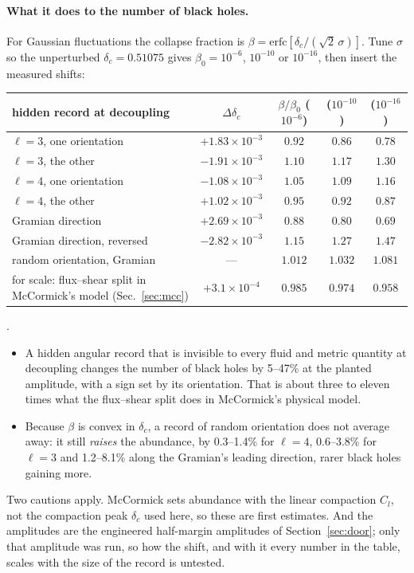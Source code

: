 \paragraph{What it does to the number of black holes.} For Gaussian fluctuations the collapse fraction is $\beta=\mathrm{erfc}[\delta_c/(\sqrt2\,\sigma)]$. Tune $\sigma$ so the unperturbed $\delta_c=0.51075$ gives $\beta_0=10^{-6}$, $10^{-10}$ or $10^{-16}$, then insert the measured shifts:
\begin{center}\small\begin{tabular}{lcccc}\toprule
hidden record at decoupling & $\Delta\delta_c$ & $\beta/\beta_0$ ($10^{-6}$) & ($10^{-10}$) & ($10^{-16}$)\\\midrule
$\ell=3$, one orientation & $+1.83\times10^{-3}$ & $0.92$ & $0.86$ & $0.78$\\
$\ell=3$, the other & $-1.91\times10^{-3}$ & $1.10$ & $1.17$ & $1.30$\\
$\ell=4$, one orientation & $-1.08\times10^{-3}$ & $1.05$ & $1.09$ & $1.16$\\
$\ell=4$, the other & $+1.02\times10^{-3}$ & $0.95$ & $0.92$ & $0.87$\\
Gramian direction & $+2.69\times10^{-3}$ & $0.88$ & $0.80$ & $0.69$\\
Gramian direction, reversed & $-2.82\times10^{-3}$ & $1.15$ & $1.27$ & $1.47$\\
random orientation, Gramian & --- & $1.012$ & $1.032$ & $1.081$\\\midrule
for scale: flux--shear split in McCormick's model (Sec.~\ref{sec:mcc}) & $+3.1\times10^{-4}$ & $0.985$ & $0.974$ & $0.958$\\\bottomrule\end{tabular}\end{center}
.
\begin{itemize}
\item A hidden angular record that is invisible to every fluid and metric quantity at decoupling changes the number of black holes by 5--47\% at the planted amplitude, with a sign set by its orientation. That is about three to eleven times what the flux--shear split does in McCormick's physical model.
\item Because $\beta$ is convex in $\delta_c$, a record of random orientation does not average away: it still \emph{raises} the abundance, by 0.3--1.4\% for $\ell=4$, 0.6--3.8\% for $\ell=3$ and 1.2--8.1\% along the Gramian's leading direction, rarer black holes gaining more.
\end{itemize}
Two cautions apply. McCormick sets abundance with the linear compaction $C_l$, not the compaction peak $\delta_c$ used here, so these are first estimates. And the amplitudes are the engineered half-margin amplitudes of Section~\ref{sec:door}; only that amplitude was run, so how the shift, and with it every number in the table, scales with the size of the record is untested.

